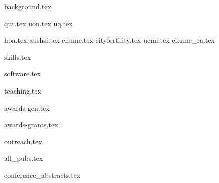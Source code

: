 \documentclass[11pt]{article}
\begin{document}
{background.tex}

{qut.tex}
{uon.tex}
{uq.tex}

\vspace{1mm}
{hpa.tex}
{aushsi.tex}
{ellume.tex}
{cityfertility.tex}
{ucmi.tex}
{ellume_ra.tex}

\vspace{1mm}
{skills.tex}

\vspace{1mm}
{software.tex}

\vspace{1mm}
{teaching.tex}

\vspace{1mm}
{awards-gen.tex}

\vspace{1mm}
{awards-grants.tex}

\vspace{1mm}
{outreach.tex}

\vspace{1mm}
\begin{enumerate}
	{all_pubs.tex}
\end{enumerate}\par

\newpage

\vspace{1mm}
{conference_abstracts.tex}
\end{document}
